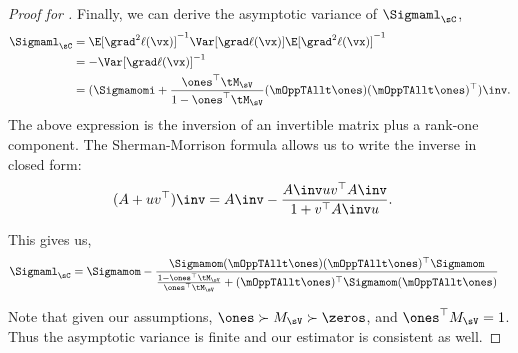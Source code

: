 \begin{proof}[Proof for ]
Finally, we can derive the asymptotic variance of $\Sigmaml_\sC$,
\begin{align*}
    \Sigmaml_{\sC} 
      &= \E[\grad^2 \ell(\vx)]^{-1} \Var [\grad \ell(\vx)] \E[\grad^2 \ell(\vx)]^{-1} \\
      &= -\Var[\grad \ell(\vx)]^{-1} \\
      &= ({\Sigmamomi} + \frac{\ones^\top \tM_\sV}{1 - \ones^\top \tM_\sV} (\mOppTAllt  \ones)(\mOppTAllt \ones)^\top)\inv.
\end{align*}
The above expression is the inversion of an invertible matrix plus a rank-one component. The Sherman-Morrison formula allows us to write the inverse in closed form:
\begin{align*}
  (A + uv^\top)\inv &= A\inv - \frac{A\inv uv^\top A\inv}{1 + v^\top A\inv u}.
\end{align*}

This gives us,
\begin{align}
    \Sigmaml_{\sC} 
    &= \Sigmamom - \frac{\Sigmamom (\mOppTAllt \ones)(\mOppTAllt \ones)^\top \Sigmamom}{\frac{1 - \ones^\top \tM_\sV}{\ones^\top \tM_\sV} + (\mOppTAllt \ones)^\top \Sigmamom (\mOppTAllt \ones)}
    \label{eqn:asymp-var-ml}
\end{align}

Note that given our assumptions, $\ones \succ M_\sV \succ \zeros$, and
  $\ones^\top M_\sV = 1$. 
Thus the asymptotic variance is finite and our estimator is consistent
  as well. 
\end{proof}

